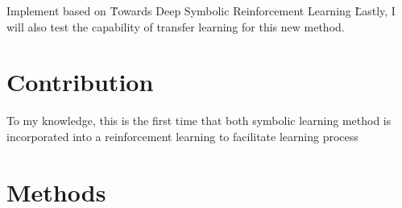 \documentclass[12pt,twoside]{report}
\begin{document}
Implement based on \"Towards Deep Symbolic Reinforcement Learning \"

Lastly, I will also test the capability of transfer learning for this new method.

\section{Contribution}

To my knowledge, this is the first time that both symbolic learning method is incorporated into a reinforcement learning to facilitate learning process

\section{Methods}
\end{document}
